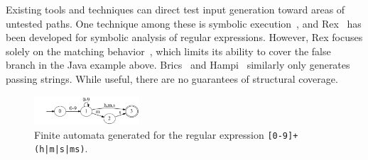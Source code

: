 Existing tools and techniques can direct test input generation toward areas of untested paths. %
One technique among these is symbolic execution~\cite{li2009reggae, king1976symbolic, jpf, klee, Ghosh:2013:JAT:2486788.2486925}, and Rex~\cite{rex} has been developed for symbolic analysis of regular expressions. %
However, Rex focuses solely on the matching behavior~\cite{rex}, which limits its ability to cover the false branch in the Java example above. Brics~\cite{brics} and Hampi~\cite{kiezun2009hampi, hampi} similarly only generates passing strings. 
While useful, there are no guarantees of structural coverage. 





\iffalse
\begin{figure}[t]
	\centering
	\includegraphics[width=0.35\textwidth]{figures/bugnfa}
	\vspace{-6pt}
	\caption{Finite automata generated for the regular expression \texttt{[0-9]+(h|m|s|ms)}.}
	\label{fig:nfa}    
	\vspace{-6pt}
\end{figure}

